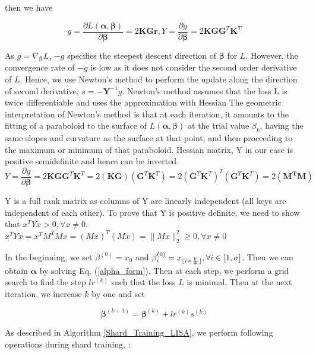 then we have 

\begin{equation}
	g=\frac{\partial L(\boldsymbol{\alpha},\boldsymbol{\beta})}{\partial \boldsymbol{\beta}}=2\boldsymbol{KGr},
	Y=\frac{\partial g}{\partial \boldsymbol{\beta}}=2\boldsymbol{KGG}^T \boldsymbol{K}^T
\end{equation}

As $g=\nabla_{\boldsymbol{\beta}} L$, $-g$ specifies the steepest descent direction of $\boldsymbol{\beta}$ for $L$. However, the convergence rate of $-g$ is low as it does not consider the second order derivative of $L$. Hence, we use Newton's method to perform the update along the direction of second derivative, $s=-\boldsymbol{Y}^{-1}g$. Newton's method assumes that the loss L is twice differentiable and uses the approximation with Hessian
The geometric interpretation of Newton's method is that at each iteration, it amounts to the fitting of a paraboloid to the surface of $L(\boldsymbol{\alpha},\boldsymbol{\beta})$  at the trial value $\beta_{k}$, having the same slopes and curvature as the surface at that point, and then proceeding to the maximum or minimum of that paraboloid. 
Hessian matrix, Y in our case is positive semidefinite and hence can be inverted. 
\begin{equation}
	Y=\frac{\partial g}{\partial \boldsymbol{\beta}}=2\boldsymbol{KGG}^T \boldsymbol{K}^T= 2 \boldsymbol{(KG)} (\boldsymbol{G}^T \boldsymbol{K}^T)=2 (\boldsymbol{G}^T \boldsymbol{K}^T)^T (\boldsymbol{G}^T \boldsymbol{K}^T)= 2\boldsymbol{({M}^TM)}
\end{equation}

Y is a full rank matrix as columns of Y are linearly independent (all keys are independent of each other). To prove that Y is positive definite, we need to show that ${x}^TYx > 0,  \forall x \neq 0$. \\ 
${x}^TYx = {x}^T{M}^TMx = {(Mx)}^T(Mx) = \| Mx\|_{2}^{2} \geq 0,\forall x \neq 0 $

In the beginning, we set $\beta^{(0)}=x_0$ and $\beta_i^{(0)}=x_{\lfloor i\times \frac{V}{\Psi}\rfloor}, \forall i\in[1,\sigma]$. Then we can obtain $\boldsymbol{\alpha}$ by solving Eq. (\ref{alpha_form}). Then at each step, we perform a grid search to find the step $lr^{(k)}$ such that the loss $L$ is minimal. Then at the next iteration, we increase $k$ by one and set 

$$
\boldsymbol{\beta}^{(k+1)}=\boldsymbol{\beta}^{(k)} + lr^{(k)}s^{(k)}
$$

As described in Algorithm \ref{Shard_Training_LISA}, we perform  following operations during shard training, :

